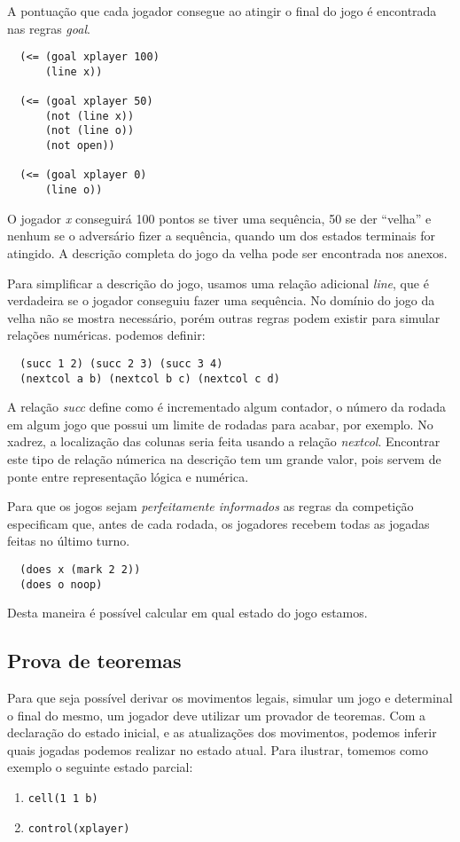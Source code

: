 A pontuação que cada jogador consegue ao atingir o final do jogo é encontrada
nas regras {\it goal}.
\begin{verbatim}
  (<= (goal xplayer 100)
      (line x))
 
  (<= (goal xplayer 50)
      (not (line x))
      (not (line o))
      (not open))
 
  (<= (goal xplayer 0)
      (line o))
\end{verbatim}
O jogador {\it x} conseguirá 100 pontos se tiver uma sequência, 50 se der
``velha'' e nenhum se o adversário fizer a sequência, quando um dos estados
terminais for atingido. A descrição completa do jogo da velha pode ser
encontrada nos anexos.

Para simplificar a descrição do jogo, usamos uma relação adicional {\it line}, 
que é verdadeira se o jogador conseguiu fazer uma sequência. No domínio do jogo
da velha não se mostra necessário, porém outras regras podem existir para
simular relações numéricas.
podemos definir: 
\begin{verbatim}
  (succ 1 2) (succ 2 3) (succ 3 4)
  (nextcol a b) (nextcol b c) (nextcol c d)
\end{verbatim}
A relação {\it succ} define como é incrementado algum contador, o número da
rodada em algum jogo que possui um limite de rodadas para acabar, por
exemplo. No xadrez, a localização das colunas seria feita usando a relação {\it
  nextcol}. Encontrar este tipo de relação númerica na descrição tem um grande 
valor, pois servem de ponte entre representação lógica e numérica.


Para que os jogos sejam {\it perfeitamente informados} as regras da competição
especificam que, antes de cada rodada, os jogadores recebem todas as jogadas
feitas no último turno.
\begin{verbatim}
  (does x (mark 2 2))
  (does o noop)
\end{verbatim}
Desta maneira é possível calcular em qual estado do jogo estamos.

\subsection{Prova de teoremas}
Para que seja possível derivar os movimentos legais, simular um jogo e
determinal o final do mesmo, um jogador deve utilizar um provador de
teoremas. Com a declaração do estado inicial, e as atualizações dos movimentos,
podemos inferir quais jogadas podemos realizar no estado atual. Para ilustrar,
tomemos como exemplo o seguinte estado parcial:
\begin{enumerate}
  \item \verb|cell(1 1 b)|
  \item \verb|control(xplayer)|
\end{enumerate}

